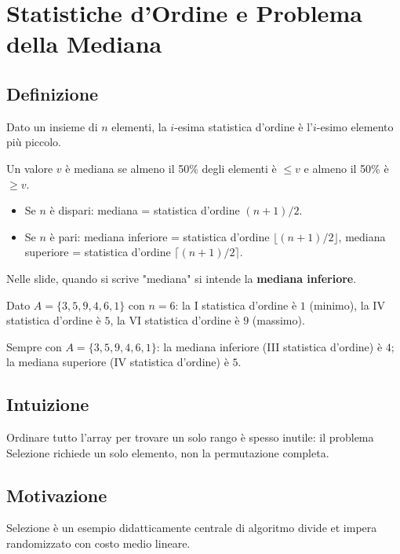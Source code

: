 \section{Statistiche d'Ordine e Problema della Mediana}

\subsection{Definizione}
\begin{definizione}
Dato un insieme di $n$ elementi, la $i$-esima statistica d'ordine è l'$i$-esimo elemento più piccolo.
\end{definizione}

\begin{definizione}[Mediana]
Un valore $v$ è mediana se almeno il 50\% degli elementi è $\le v$ e almeno il 50\% è $\ge v$.
\begin{itemize}
	\item Se $n$ è dispari: mediana = statistica d'ordine $(n+1)/2$.
	\item Se $n$ è pari: mediana inferiore = statistica d'ordine $\lfloor (n+1)/2\rfloor$, mediana superiore = statistica d'ordine $\lceil (n+1)/2\rceil$.
\end{itemize}
Nelle slide, quando si scrive "mediana" si intende la \textbf{mediana inferiore}.
\end{definizione}

\begin{esempio}
	Dato $A=\{3,5,9,4,6,1\}$ con $n=6$: la I statistica d'ordine è $1$ (minimo),
	la IV statistica d'ordine è $5$, la VI statistica d'ordine è $9$ (massimo).
\end{esempio}

\begin{esempio}
	Sempre con $A=\{3,5,9,4,6,1\}$: la mediana inferiore (III statistica d'ordine) è $4$;
	la mediana superiore (IV statistica d'ordine) è $5$.
\end{esempio}

\subsection{Intuizione}
Ordinare tutto l'array per trovare un solo rango è spesso inutile: il problema Selezione richiede un solo elemento, non la permutazione completa.

\subsection{Motivazione}
Selezione è un esempio didatticamente centrale di algoritmo divide et impera randomizzato con costo medio lineare.

